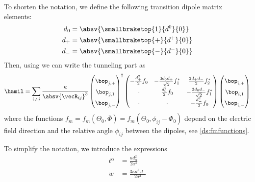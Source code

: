 To shorten the notation, we define the following transition dipole matrix elements:
\begin{align}
    d_0 &= \absv{ \smallbraketop{1}{d^0}{0} } \\
    d_+ &= \absv{ \smallbraketop{{+}}{d^+}{0} } \\
    d_- &= \absv{ \smallbraketop{{-}}{d^-}{0} }
\end{align}
Then, using  we can write the tunneling part as
\begin{align}
    \hamil = \sum_{i\ne j} \frac{\kappa}{\absv{\vecR_{ij}}^3}
    \begin{pmatrix}
        \bop_{j,+} \\
        \bop_{j,1} \\
        \bop_{j,-}
    \end{pmatrix}^{\dag}
    \begingroup
        \renewcommand*{\arraystretch}{1.5}
        \begin{pmatrix}
            -\frac{d_+^2}{2} f_0 & -\frac{3d_0d_+}{\sqrt{2}} f_1^* & \frac{3d_+d_-}{2} f_2^* \\
            \cdot & \frac{d_0^2}{2} f_0 & -\frac{3d_0d_-}{\sqrt{2}} f_1^* \\
            \cdot & \cdot & -\frac{d_-^2}{2} f_0 \\
        \end{pmatrix}
    \endgroup
    \begin{pmatrix}
        \bop_{i,+} \\
        \bop_{i,1} \\
        \bop_{i,-}
    \end{pmatrix}^{\vphantom\dag}
\end{align}
where the functions $f_m = f_m(\Theta_0, \bar\Phi) = f_m(\Theta_0, \phi_{ij} - \Phi_0)$ depend on the electric field direction and the relative angle $\phi_{ij}$ between the dipoles, see \cref{ds:fmfunctions}.

To simplify the notation, we introduce the expressions
\begin{align}
    t^\alpha &= \frac{\kappa d_\alpha^2}{2a^3} \\
    w &= \frac{3\kappa d^+d^-}{2a^3}
\end{align}

